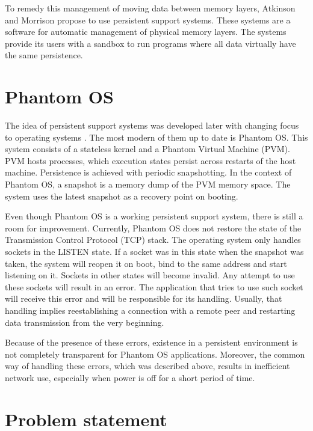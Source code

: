 To remedy this management of moving data between memory layers, Atkinson and
Morrison \cite{atkinson1995orthogonally} propose to use persistent support
systems. These systems are a software for automatic management of physical
memory layers. The systems provide its users with a sandbox to run programs
where all data virtually have the same persistence.

\section{Phantom OS}
\label{sec:int:phantom}

The idea of persistent support systems was developed later with changing focus
to operating systems
\cite{landau1992checkpoint,dearle1994grasshopper,atkinson2000review}.
The most modern of them up to date is Phantom OS. This system consists of a
stateless kernel and a Phantom Virtual Machine (PVM). PVM hosts processes,
which execution states persist across restarts of the host machine. Persistence
is achieved with periodic snapshotting. In the context of Phantom OS, a
snapshot is a memory dump of the PVM memory space. The system uses the latest
snapshot as a recovery point on booting.

Even though Phantom OS is a working persistent support system, there is still a
room for improvement. Currently, Phantom OS does not restore the state of the
Transmission Control Protocol (TCP) stack. The operating system only handles
sockets in the LISTEN state. If a socket was in this state when the snapshot
was taken, the system will reopen it on boot, bind to the same address and
start listening on it. Sockets in other states will become invalid. Any
attempt to use these sockets will result in an error. The application that
tries to use such socket will receive this error and will be responsible for
its handling. Usually, that handling implies reestablishing a connection with a
remote peer and restarting data transmission from the very beginning.

Because of the presence of these errors, existence in a persistent environment
is not completely transparent for Phantom OS applications. Moreover, the common
way of handling these errors, which was described above, results in inefficient
network use, especially when power is off for a short period of time. 

\section{Problem statement}

